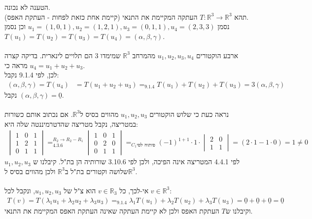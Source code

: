\documentclass{article}
\DeclareMathOperator*{\equals}{=}
\def\reals{\mathbb{R}}
\def\zerovec{\underline{0}}
\begin{document}
הטענה לא נכונה.\\
תהא $T:\reals^3\rightarrow \reals^3$ העתקה המקיימת את התנאי (קיימת אחת כזאת לפחות - העתקת האפס).\\
נסמן $u_1=(1,0,1), u_2=(1,2,1), u_3=(0,1,1), u_4=(2,3,3)$ וכן נסמן $T(u_1)=T(u_2)=T(u_3)=T(u_4)=(\alpha, \beta, \gamma)$.
\\\\
ארבע הוקטורים $u_1, u_2, u_3, u_4$ מהמרחב $\reals^3$ שמימדו 3 הם תלויים לינארית. בדיקה קצרה מראה כי $u_4=u_1+u_2+u_3$.  \\
לכן, לפי 9.1.4 נקבל:
\begin{align*}
    (\alpha, \beta, \gamma)=T(u_4) & =T(u_1+u_2+u_3)\equals_{9.1.4}T(u_1)+T(u_2)+T(u_3)=3(\alpha, \beta, \gamma)
\end{align*}
נקבל $(\alpha, \beta, \gamma)=\zerovec$.
\\\\
נראה כעת כי שלוש הוקטורים $u_1, u_2, u_3$ מהווים בסיס ל$\reals^3$. אם נכתוב אותם כשורות במטריצה, נקבל מטריצה שהדטרמיננטה שלה היא:
\begin{align*}
    \begin{vmatrix}
        1 & 0 & 1 \\
        1 & 2 & 1 \\
        0 & 1 & 1
    \end{vmatrix}
    \equals_{4.3.6}^{R_2\rightarrow R_2-R_1}
    \begin{vmatrix}
        1 & 0 & 1 \\
        0 & 2 & 0 \\
        0 & 1 & 1
    \end{vmatrix}
    \equals_{C_1 \text{פיתוח לפי}}
    (-1)^{1+1} \cdot 1 \cdot \begin{vmatrix}
        2 & 0 \\
        1 & 1
    \end{vmatrix}=
    (2\cdot 1 - 1\cdot 0) = 1\ne 0
\end{align*}
לפי 4.4.1 המטריצה אינה הפיכה, ולכן לפי 3.10.6 שורותיה הן בת"ל. קיבלנו ש $u_1, u_2, u_3$ שלושה וקטורים בת"ל ב$\reals^3$ ולכן מהווים בסיס ל$\reals^3$.
\\\\
אי-לכך, כל $v\in \reals_3$ הוא צ"ל של $u_1, u_2, u_3$, ונקבל לכל $v\in\reals^3$:
\begin{align*}
    T(v)=T(\lambda_1u_1+\lambda_2u_2+\lambda_3u_3)\equals_{9.1.4}\lambda_1T(u_1)+\lambda_2T(u_2)+\lambda_3T(u_3)=\zerovec+\zerovec+\zerovec = \zerovec
\end{align*}
וקיבלנו ש$T$ העתקת האפס ולכן לא קיימת העתקה שאינה העתקת האפס המקיימת את התנאי.
\end{document}
